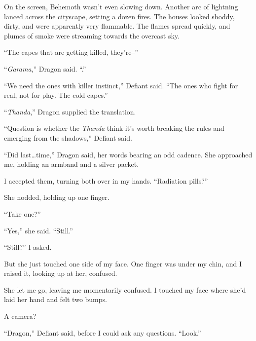 On the screen, Behemoth wasn't even slowing down.  Another arc of lightning lanced across the cityscape, setting a dozen fires.  The houses looked shoddy, dirty, and were apparently very flammable.  The flames spread quickly, and plumes of smoke were streaming towards the overcast sky.



``The capes that are getting killed, they're--''



``\emph{Garama},'' Dragon said.  ``\ldotsHot.''



``We need the ones with killer instinct,'' Defiant said.  ``The ones who fight for real, not for play.  The cold capes.''



``\emph{Thanda},'' Dragon supplied the translation.



``Question is whether the \emph{Thanda} think it's worth breaking the rules and emerging from the shadows,'' Defiant said.



``Did last\ldots  time,'' Dragon said, her words bearing an odd cadence.  She approached me, holding an armband and a silver packet.



I accepted them, turning both over in my hands.  ``Radiation pills?''



She nodded, holding up one finger.



``Take one?''



``Yes,'' she said.  ``Still.''



``Still?''  I asked.



But she just touched one side of my face.  One finger was under my chin, and I raised it, looking up at her, confused.



She let me go, leaving me momentarily confused.  I touched my face where she'd laid her hand and felt two bumps.



A camera?



``Dragon,'' Defiant said, before I could ask any questions.  ``Look.''



